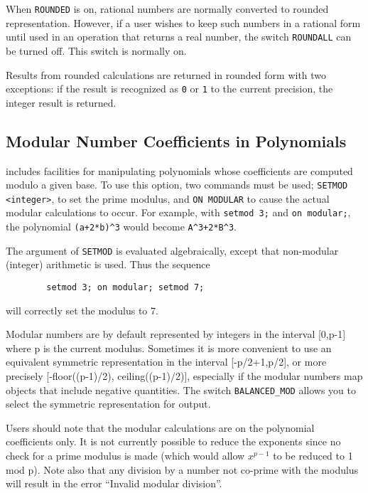 When {\tt ROUNDED} is on, rational numbers are normally converted to
rounded representation.  However, if a user wishes to keep such numbers in
a rational form until used in an operation that returns a real number,
the switch {\tt ROUNDALL} can be turned off.  This
switch is normally on.

Results from rounded calculations are returned in rounded form with two
exceptions: if the result is recognized as {\tt 0} or {\tt 1} to the
current precision, the integer result is returned.

\subsection{Modular Number Coefficients in Polynomials}
{\REDUCE} includes facilities for manipulating polynomials whose
coefficients are computed modulo a given base.  To use this option, two
commands must be used; {\tt SETMOD} {\tt <integer>}, to set
the prime modulus, and {\tt ON MODULAR} to cause the
actual modular calculations to occur.
For example, with {\tt setmod 3;} and {\tt on modular;}, the polynomial
{\tt (a+2*b)\verb|^|3} would become {\tt A\verb|^|3+2*B\verb|^|3}.

The argument of {\tt SETMOD} is evaluated algebraically, except that
non-modular (integer) arithmetic is used.  Thus the sequence
\begin{verbatim}
        setmod 3; on modular; setmod 7;
\end{verbatim}
will correctly set the modulus to 7.

Modular numbers are by default represented by integers in the interval
[0,p-1] where p is the current modulus.  Sometimes it is more convenient
to use an equivalent symmetric representation in the interval
[-p/2+1,p/2], or more precisely
[-floor((p-1)/2), ceiling((p-1)/2)],
especially if the modular numbers map objects that include
negative quantities.  The switch {\tt BALANCED\_MOD}
allows you to select the symmetric representation for output.

Users should note that the modular calculations are on the polynomial
coefficients only.  It is not currently possible to reduce the exponents
since no check for a prime modulus is made (which would allow
$x^{p-1}$ to be reduced to 1 mod p).  Note also that any division by a
number not co-prime with the modulus will result in the error ``Invalid
modular division''.

